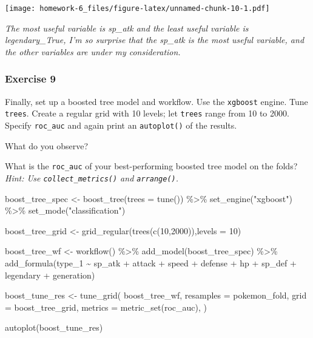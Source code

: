\documentclass[
]{article}
\newenvironment{Shaded}{\begin{snugshade}}{\end{snugshade}}
\newcommand{\AttributeTok}[1]{\textcolor[rgb]{0.77,0.63,0.00}{#1}}
\newcommand{\DecValTok}[1]{\textcolor[rgb]{0.00,0.00,0.81}{#1}}
\newcommand{\FunctionTok}[1]{\textcolor[rgb]{0.00,0.00,0.00}{#1}}
\newcommand{\NormalTok}[1]{#1}
\newcommand{\OtherTok}[1]{\textcolor[rgb]{0.56,0.35,0.01}{#1}}
\newcommand{\SpecialCharTok}[1]{\textcolor[rgb]{0.00,0.00,0.00}{#1}}
\newcommand{\StringTok}[1]{\textcolor[rgb]{0.31,0.60,0.02}{#1}}
\begin{document}
\texttt{[image: homework-6\_files/figure-latex/unnamed-chunk-10-1.pdf]}

\hfill\break
\emph{The most useful variable is sp\_atk and the least useful variable
is legendary\_True, I'm so surprise that the sp\_atk is the most useful
variable, and the other variables are under my consideration.}

\hypertarget{exercise-9}{%
\subsubsection{Exercise 9}\label{exercise-9}}

Finally, set up a boosted tree model and workflow. Use the
\texttt{xgboost} engine. Tune \texttt{trees}. Create a regular grid with
10 levels; let \texttt{trees} range from 10 to 2000. Specify
\texttt{roc\_auc} and again print an \texttt{autoplot()} of the results.

What do you observe?

What is the \texttt{roc\_auc} of your best-performing boosted tree model
on the folds? \emph{Hint: Use \texttt{collect\_metrics()} and
\texttt{arrange()}.}

\begin{Shaded}
\begin{Highlighting}[]
\NormalTok{boost\_tree\_spec }\OtherTok{\textless{}{-}} \FunctionTok{boost\_tree}\NormalTok{(}\AttributeTok{trees =} \FunctionTok{tune}\NormalTok{()) }\SpecialCharTok{\%\textgreater{}\%}
  \FunctionTok{set\_engine}\NormalTok{(}\StringTok{"xgboost"}\NormalTok{) }\SpecialCharTok{\%\textgreater{}\%}
  \FunctionTok{set\_mode}\NormalTok{(}\StringTok{"classification"}\NormalTok{)}

\NormalTok{boost\_tree\_grid }\OtherTok{\textless{}{-}} \FunctionTok{grid\_regular}\NormalTok{(}\FunctionTok{trees}\NormalTok{(}\FunctionTok{c}\NormalTok{(}\DecValTok{10}\NormalTok{,}\DecValTok{2000}\NormalTok{)),}\AttributeTok{levels =} \DecValTok{10}\NormalTok{)}

\NormalTok{boost\_tree\_wf }\OtherTok{\textless{}{-}} \FunctionTok{workflow}\NormalTok{() }\SpecialCharTok{\%\textgreater{}\%}
  \FunctionTok{add\_model}\NormalTok{(boost\_tree\_spec) }\SpecialCharTok{\%\textgreater{}\%}
  \FunctionTok{add\_formula}\NormalTok{(type\_1 }\SpecialCharTok{\textasciitilde{}}\NormalTok{ sp\_atk }\SpecialCharTok{+}\NormalTok{ attack }\SpecialCharTok{+}\NormalTok{ speed }\SpecialCharTok{+} 
\NormalTok{                defense }\SpecialCharTok{+}\NormalTok{ hp }\SpecialCharTok{+}\NormalTok{ sp\_def }\SpecialCharTok{+}\NormalTok{ legendary }\SpecialCharTok{+}\NormalTok{ generation)}

\NormalTok{boost\_tune\_res }\OtherTok{\textless{}{-}} \FunctionTok{tune\_grid}\NormalTok{(}
\NormalTok{  boost\_tree\_wf, }
  \AttributeTok{resamples =}\NormalTok{ pokemon\_fold, }
  \AttributeTok{grid =}\NormalTok{ boost\_tree\_grid, }
  \AttributeTok{metrics =} \FunctionTok{metric\_set}\NormalTok{(roc\_auc),}
\NormalTok{)}
 
\FunctionTok{autoplot}\NormalTok{(boost\_tune\_res)}
\end{Highlighting}
\end{Shaded}
\end{document}
